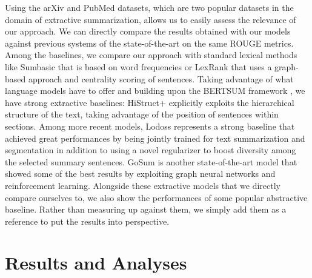 Using the arXiv and PubMed datasets, which are two popular datasets in the domain of extractive summarization, allows us to easily assess the relevance of our approach. We can directly compare the results obtained with our models against previous systems of the state-of-the-art on the same ROUGE metrics. 
Among the baselines, we compare our approach with standard lexical methods like Sumbasic \cite{vanderwende2007beyond} that is based on word frequencies or LexRank \cite{erkan2004lexrank} that uses a graph-based approach and centrality scoring of sentences. Taking advantage of what language models have to offer and building upon the BERTSUM framework \cite{liu-lapata-2019-text}, we have strong extractive baselines: HiStruct+ \cite{ruan-etal-2022-histruct} explicitly exploits the hierarchical structure of the text, taking advantage of the position of sentences within sections. Among more recent models, Lodoss \cite{cho-etal-2022-toward} represents a strong baseline that achieved great performances by being jointly trained for text summarization and segmentation in addition to using a novel regularizer to boost diversity among the selected summary sentences. GoSum \cite{bian2023gosum} is another state-of-the-art model that showed some of the best results by exploiting graph neural networks and reinforcement learning. Alongside these extractive models that we directly compare ourselves to, we also show the performances of some popular abstractive baseline. Rather than measuring up against them, we simply add them as a reference to put the results into perspective. 

\section{Results and Analyses}

